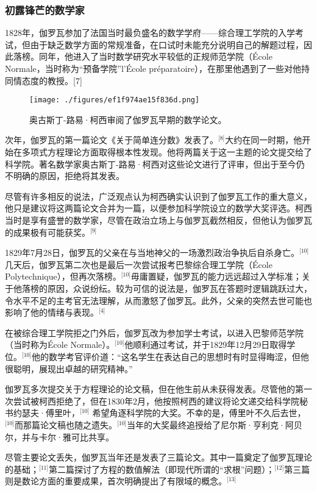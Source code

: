\subsubsection{初露锋芒的数学家}
1828年，伽罗瓦参加了法国当时最负盛名的数学学府——综合理工学院的入学考试，但由于缺乏数学方面的常规准备，在口试时未能充分说明自己的解题过程，因此落榜。同年，他进入了当时数学研究水平较低的正规师范学院（École Normale，当时称为“预备学院”l’École préparatoire），在那里他遇到了一些对他持同情态度的教授。[7]
\begin{figure}[ht]
\centering
\texttt{[image: ./figures/ef1f974ae15f836d.png]}
\caption{奥古斯丁-路易·柯西审阅了伽罗瓦早期的数学论文。} \label{fig_AWLS_2}
\end{figure}
次年，伽罗瓦的第一篇论文《关于简单连分数》发表了。\(^\text{[8]}\)大约在同一时期，他开始在多项式方程理论方面取得根本性发现。他将两篇关于这一主题的论文提交给了科学院。著名数学家奥古斯丁-路易·柯西对这些论文进行了评审，但出于至今仍不明确的原因，拒绝将其发表。

尽管有许多相反的说法，广泛观点认为柯西确实认识到了伽罗瓦工作的重大意义，他只是建议将这两篇论文合并为一篇，以便参加科学院设立的数学大奖评选。柯西当时是享有盛誉的数学家，尽管在政治立场上与伽罗瓦截然相反，但他认为伽罗瓦的成果极有可能获奖。\(^\text{[9]}\)

1829年7月28日，伽罗瓦的父亲在与当地神父的一场激烈政治争执后自杀身亡。\(^\text{[10]}\)几天后，伽罗瓦第二次也是最后一次尝试报考巴黎综合理工学院（École Polytechnique），但再次落榜。\(^\text{[10]}\)毋庸置疑，伽罗瓦的能力远远超过入学标准；关于他落榜的原因，众说纷纭。较为可信的说法是，伽罗瓦在答题时逻辑跳跃过大，令水平不足的主考官无法理解，从而激怒了伽罗瓦。此外，父亲的突然去世可能也影响了他的情绪与表现。\(^\text{[4]}\)

在被综合理工学院拒之门外后，伽罗瓦改为参加学士考试，以进入巴黎师范学院（当时称为École Normale）。\(^\text{[10]}\)他顺利通过考试，并于1829年12月29日取得学位。\(^\text{[10]}\)他的数学考官评价道：“这名学生在表达自己的思想时有时显得晦涩，但他很聪明，展现出卓越的研究精神。”

伽罗瓦多次提交关于方程理论的论文稿，但在他生前从未获得发表。尽管他的第一次尝试被柯西拒绝了，但在1830年2月，他按照柯西的建议将论文递交给科学院秘书约瑟夫·傅里叶，\(^\text{[10]}\) 希望角逐科学院的大奖。不幸的是，傅里叶不久后去世，\(^\text{[10]}\)而那篇论文稿也随之遗失。\(^\text{[10]}\)当年的大奖最终追授给了尼尔斯·亨利克·阿贝尔，并与卡尔·雅可比共享。

尽管主要论文丢失，伽罗瓦当年还是发表了三篇论文。其中一篇奠定了伽罗瓦理论的基础；\(^\text{[11]}\)第二篇探讨了方程的数值解法（即现代所谓的“求根”问题）；\(^\text{[12]}\)第三篇则是数论方面的重要成果，首次明确提出了有限域的概念。\(^\text{[13]}\)
